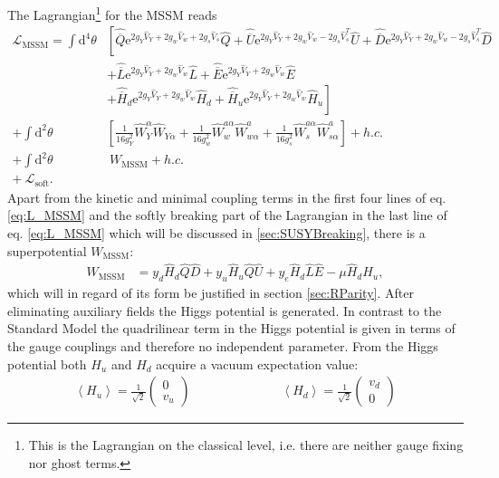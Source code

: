 The Lagrangian\footnote{This is the Lagrangian on the classical level, i.e. there are neither gauge fixing nor ghost terms.} for the MSSM reads
\begin{align}
\mathcal{L}_{\mathrm{MSSM}} = \int \mathrm{d}^4 \theta & \left[ \hat{\overline{Q}}\mathrm{e}^{2g_Y \hat{V}_Y + 2g_w\hat{V}_w + 2g_s\hat{V}_s}\hat{Q} + \hat{\overline{U}}\mathrm{e}^{2g_Y \hat{V}_Y + 2g_w\hat{V}_w - 2g_s\hat{V}^T_s}\hat{U} + \hat{\overline{D}}\mathrm{e}^{2g_Y \hat{V}_Y + 2g_w\hat{V}_w - 2g_s\hat{V}^T_s}\hat{D} \right.\nonumber\\
 & + \hat{\overline{L}}\mathrm{e}^{2g_Y \hat{V}_Y + 2g_w\hat{V}_w}\hat{L} + \hat{\overline{E}}\mathrm{e}^{2g_Y \hat{V}_Y + 2g_w\hat{V}_w}\hat{E}\nonumber\\
 & + \left. \hat{\overline{H}}_d\mathrm{e}^{2g_Y \hat{V}_Y + 2g_w\hat{V}_w}\hat{H}_d + \hat{\overline{H}}_u\mathrm{e}^{2g_Y \hat{V}_Y + 2g_w\hat{V}_w}\hat{H}_u \right]\nonumber\\
 + \int \mathrm{d}^2\theta & \left[ \frac{1}{16g_Y^2} \hat{W}_Y^{\alpha}\hat{W}_{Y\alpha} + \frac{1}{16g_w^{2}} \hat{W}_w^{a\alpha}\hat{W}^a_{w\alpha} + \frac{1}{16g_s^2} \hat{W}_s^{a\alpha}\hat{W}^a_{s\alpha} \right] + h.c.\nonumber\\
 + \int \mathrm{d}^2\theta&\ W_{\mathrm{MSSM}} + h.c.\nonumber\\
 +\  \mathcal{L}_{\mathrm{soft}}.\ &\label{eq:L_MSSM}
\end{align}
Apart from the kinetic and minimal coupling terms in the first four lines of eq. \eqref{eq:L_MSSM} and the softly breaking part of the Lagrangian in the last line of eq. \eqref{eq:L_MSSM} which will be discussed in \ref{sec:SUSYBreaking}, there is a superpotential $W_{\mathrm{MSSM}}$:
\begin{align}
W_\mathrm{{MSSM}} &= y_d \hat{H}_d \hat{Q} \hat{D} + y_u \hat{H}_u \hat{Q} \hat U + y_e \hat{H}_d \hat{L} \hat{E} - \mu \hat{H}_d \hat{H}_u,\label{eq:W_MSSM}
\end{align}
which will in regard of its form be justified in section \ref{sec:RParity}. After eliminating auxiliary fields the Higgs potential is generated. In contrast to the Standard Model the quadrilinear term in the Higgs potential is given in terms of the gauge couplings and therefore no independent parameter. From the Higgs potential both $H_u$ and $H_d$ acquire a vacuum expectation value:
\begin{align}
\left\langle H_u \right\rangle = \frac{1}{\sqrt{2}}\begin{pmatrix}
0 \\ v_u
\end{pmatrix} \hspace{3cm} 
\left\langle H_d \right\rangle = \frac{1}{\sqrt{2}}\begin{pmatrix}
v_d \\ 0
\end{pmatrix}
\end{align}
